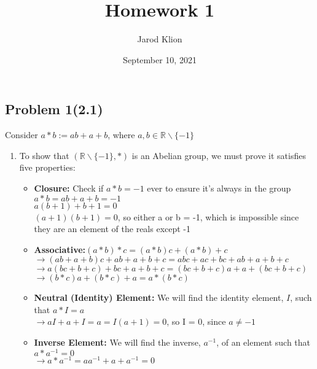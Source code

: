 \documentclass{article}
\title{Homework 1}
\author{Jarod Klion}
\date{September 10, 2021}
\begin{document}
\maketitle %


\subsection*{Problem 1(2.1)}
Consider $a * b := ab + a + b$, \quad where $a,b \in \mathbb{R}\backslash\{-1\}$
\begin{enumerate}[label=(\alph*)]
	\item To show that $(\mathbb{R}\backslash\{-1\},*)$ is an Abelian group, we must prove it satisfies five properties:
		\begin{itemize}
			\item \textbf{Closure:} Check if $a * b = -1$ ever to ensure it's always in the group \\
			$ a * b = ab + a + b = -1 $ \\
			$ a(b+1) + b + 1 = 0$ \\
			$ (a+1)(b+1) = 0$, so either a or b = -1, which is impossible since they are an element of the reals except -1
			\item \textbf{Associative:}$ (a * b) * c = (a * b)c + (a * b) + c $ \\
							$\rightarrow (ab + a + b)c + ab + a + b + c = abc + ac + bc + ab + a + b + c$ \\
							$\rightarrow a(bc + b + c) + bc + a + b + c = (bc + b + c)a + a + (bc + b + c)$ \\
							$\rightarrow (b*c)a + (b*c) + a = a * (b * c)$
			\item \textbf{Neutral (Identity) Element:} We will find the identity element, $I$, such that $ a * I = a $ \\
									$\rightarrow aI + a + I = a = I(a + 1) = 0$, so I = 0, since $a \ne -1$  
			\item \textbf{Inverse Element:} We will find the inverse, $a^{-1}$, of an element such that $a * a^{-1} = 0$ \\
							         $\rightarrow a * a^{-1} = aa^{-1} + a + a^{-1} = 0$ \\

\end{itemize}
\end{enumerate}
\end{document}
